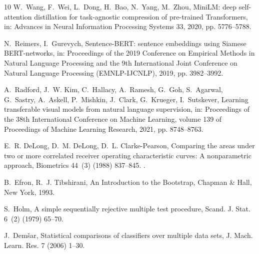 \documentclass[final,5p,twocolumn]{elsarticle}
\begin{document}
\begin{thebibliography}{10}
W.~Wang, F.~Wei, L.~Dong, H.~Bao, N.~Yang, M.~Zhou, {MiniLM}: deep
  self-attention distillation for task-agnostic compression of pre-trained
  {T}ransformers, in: Advances in Neural Information Processing Systems 33,
  2020, pp. 5776--5788.

N.~Reimers, I.~Gurevych, {Sentence-BERT}: sentence embeddings using {S}iamese
  {BERT}-networks, in: Proceedings of the 2019 Conference on Empirical Methods
  in Natural Language Processing and the 9th International Joint Conference on
  Natural Language Processing (EMNLP-IJCNLP), 2019, pp. 3982--3992.

A.~Radford, J.~W. Kim, C.~Hallacy, A.~Ramesh, G.~Goh, S.~Agarwal, G.~Sastry,
  A.~Askell, P.~Mishkin, J.~Clark, G.~Krueger, I.~Sutskever, Learning
  transferable visual models from natural language supervision, in: Proceedings
  of the 38th International Conference on Machine Learning, volume 139 of
  Proceedings of Machine Learning Research, 2021, pp. 8748--8763.

E.~R. DeLong, D.~M. DeLong, D.~L. Clarke-Pearson, Comparing the areas under two
  or more correlated receiver operating characteristic curves: A nonparametric
  approach, Biometrics 44~(3) (1988) 837--845.
\newblock \href {https://doi.org/10.2307/2531595} {}.

B.~Efron, R.~J. Tibshirani, An Introduction to the Bootstrap, Chapman \& Hall,
  New York, 1993.

S.~Holm, A simple sequentially rejective multiple test procedure, Scand. J. Stat. 6~(2) (1979) 65--70.

J.~Dem{\v{s}}ar, Statistical comparisons of classifiers over multiple data
  sets, J. Mach. Learn. Res. 7 (2006) 1--30.

\end{thebibliography}
\endgroup
\end{document}
